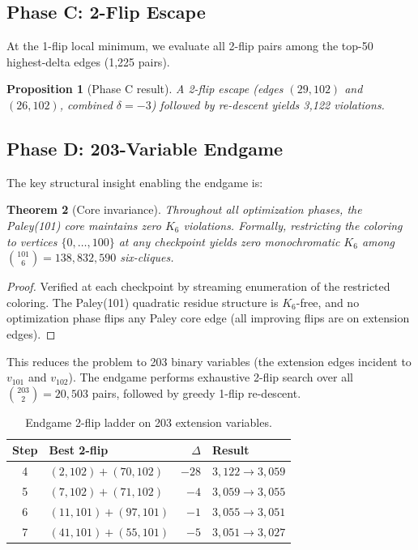 \documentclass[11pt,a4paper]{article}
\theoremstyle{plain}
\newtheorem{theorem}{Theorem}[section]
\newtheorem{proposition}[theorem]{Proposition}
\theoremstyle{remark}
\begin{document}
\subsection{Phase C: 2-Flip Escape}

At the 1-flip local minimum, we evaluate all 2-flip pairs among
the top-50 highest-delta edges (1{,}225 pairs).

\begin{proposition}[Phase C result]\label{prop:phaseC}
A 2-flip escape (edges $(29, 102)$ and $(26, 102)$, combined
$\delta = -3$) followed by re-descent yields 3{,}122 violations.
\end{proposition}

\subsection{Phase D: 203-Variable Endgame}

The key structural insight enabling the endgame is:

\begin{theorem}[Core invariance]\label{thm:core}
Throughout all optimization phases, the Paley(101) core maintains
zero $K_6$ violations. Formally, restricting the coloring to
vertices $\{0, \ldots, 100\}$ at any checkpoint yields zero
monochromatic $K_6$ among $\binom{101}{6} = 138{,}832{,}590$
six-cliques.
\end{theorem}

\begin{proof}
Verified at each checkpoint by streaming enumeration of the
restricted coloring. The Paley(101) quadratic residue structure
is $K_6$-free, and no optimization phase flips any Paley core edge
(all improving flips are on extension edges).
\end{proof}

This reduces the problem to 203 binary variables (the extension
edges incident to $v_{101}$ and $v_{102}$). The endgame performs
exhaustive 2-flip search over all $\binom{203}{2} = 20{,}503$
pairs, followed by greedy 1-flip re-descent.

\begin{table}[H]
\centering
\caption{Endgame 2-flip ladder on 203 extension variables.}
\label{tab:endgame}
\small
\begin{tabular}{@{}clrl@{}}
\toprule
\textbf{Step} & \textbf{Best 2-flip} & \textbf{$\Delta$} & \textbf{Result} \\
\midrule
4 & $(2,102) + (70,102)$ & $-28$ & $3{,}122 \to 3{,}059$ \\
5 & $(7,102) + (71,102)$ & $-4$ & $3{,}059 \to 3{,}055$ \\
6 & $(11,101) + (97,101)$ & $-1$ & $3{,}055 \to 3{,}051$ \\
7 & $(41,101) + (55,101)$ & $-5$ & $3{,}051 \to 3{,}027$ \\
\bottomrule
\end{tabular}
\end{table}
\end{document}
